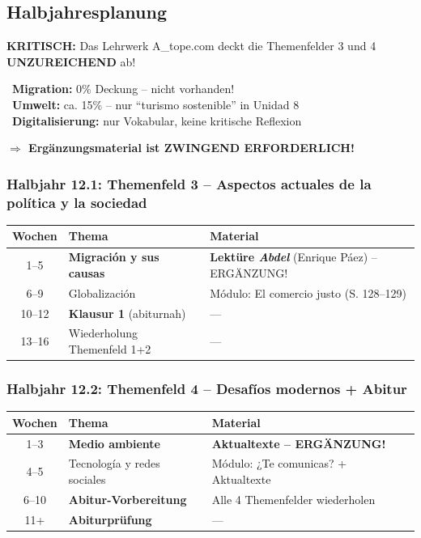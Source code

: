 \documentclass[10pt,a4paper]{article}
\begin{document}
\subsection{Halbjahresplanung}

\begin{tcolorbox}[colback=lightred, colframe=spanisch, title=\textbf{WICHTIG}]
\textbf{KRITISCH:} Das Lehrwerk A\_tope.com deckt die Themenfelder 3 und 4 \textbf{UNZUREICHEND} ab!

\textbullet\ \textbf{Migration:} 0\% Deckung -- nicht vorhanden!\\
\textbullet\ \textbf{Umwelt:} ca. 15\% -- nur ``turismo sostenible'' in Unidad 8\\
\textbullet\ \textbf{Digitalisierung:} nur Vokabular, keine kritische Reflexion

\textbf{$\Rightarrow$ Ergänzungsmaterial ist ZWINGEND ERFORDERLICH!}
\end{tcolorbox}

\subsubsection{Halbjahr 12.1: Themenfeld 3 -- Aspectos actuales de la política y la sociedad}

\begin{center}
\small
\begin{tabular}{|c|p{4.5cm}|p{6cm}|}
\hline
\rowcolor{lightgray}
\textbf{Wochen} & \textbf{Thema} & \textbf{Material} \\
\hline
1--5 & \textbf{Migración y sus causas} & \textcolor{spanisch}{\textbf{Lektüre \textit{Abdel}} (Enrique Páez) -- ERGÄNZUNG!} \\
\hline
6--9 & Globalización & Módulo: El comercio justo (S. 128--129) \\
\hline
10--12 & \textbf{Klausur 1} (abiturnah) & --- \\
\hline
13--16 & Wiederholung Themenfeld 1+2 & --- \\
\hline
\end{tabular}
\end{center}

\subsubsection{Halbjahr 12.2: Themenfeld 4 -- Desafíos modernos + Abitur}

\begin{center}
\small
\begin{tabular}{|c|p{4.5cm}|p{6cm}|}
\hline
\rowcolor{lightgray}
\textbf{Wochen} & \textbf{Thema} & \textbf{Material} \\
\hline
1--3 & \textbf{Medio ambiente} & \textcolor{spanisch}{\textbf{Aktualtexte -- ERGÄNZUNG!}} \\
\hline
4--5 & Tecnología y redes sociales & Módulo: ¿Te comunicas? + Aktualtexte \\
\hline
6--10 & \textbf{Abitur-Vorbereitung} & Alle 4 Themenfelder wiederholen \\
\hline
11+ & \textbf{Abiturprüfung} & --- \\
\hline
\end{tabular}
\end{center}
\end{document}
